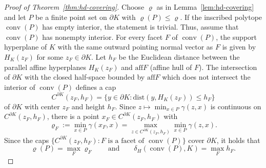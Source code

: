 \documentclass[a4paper,12pt,reqno]{amsart}
\theoremstyle{definition}
\newcommand{\dist}{\mathrm{dist}}
\DeclareMathOperator{\conv}{conv}
\newcommand{\aff}{\mathrm{aff}}
\begin{document}
\begin{proof}[Proof of Theorem~\ref{thm:hd-covering}]
	Choose $\varrho$ as in Lemma~\ref{lem:hd-covering} and let $P$ be a finite point set on $\partial K$ with $\varrho(P)\le \varrho$. If the inscribed polytope $\conv(P)$ has empty interior, the statement is trivial. Thus, assume that $\conv(P)$ has nonempty interior.  For every facet $F$ of $\conv(P)$, the support hyperplane of $K$ with the same outward pointing normal vector as $F$ is given by $H_K(z_F)$ for some $z_F\in \partial K$. Let $h_F$ be the Euclidean distance between the parallel affine hyperplanes $H_K(z_F)$ and $\aff F$ (affine hull of $F$). The intersection of $\partial K$ with the closed half-space bounded by $\aff F$ which does not intersect the interior of $\conv(P)$ defines a cap
\[
C^{\partial K}(z_F,h_F)
=\{y\in \partial K\colon \dist(y,H_K(z_F))\le h_F\}
\]
of $\partial K$ with center $z_F$ and height $h_F$. Since $z\mapsto \min_{x\in P}\gamma(z,x)$ is continuous on $C^{\partial K}(z_F,h_F)$, there is a point $x_F\in C^{\partial K}(z_F,h_F)$ with 
\[
\varrho_F
:=\min_{x\in P}\gamma(x_F,x)
=\max_{z\in C^{\partial K}(z_F,h_F)}\min_{x\in P}\gamma(z,x).
\]
Since the caps $\{C^{\partial K}(z_F,h_F)\colon F \text{ is a facet of }\conv(P)\}$ cover $\partial K$, it holds that
\begin{equation} \label{eq:max-F}
\varrho(P)
=\max_F \varrho_F \qquad \text{and}\qquad 
\delta_H(\conv(P),K)
=\max_F h_F.
\end{equation}


\end{proof}
\end{document}
